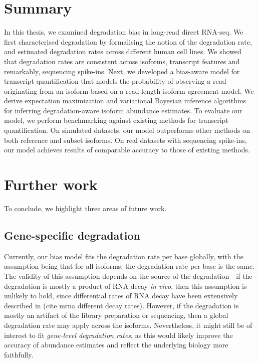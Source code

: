
\section{Summary}

In this thesis, we examined degradation bias in long-read direct RNA-seq. We first characterised degradation by formalising the notion of the degradation rate, and estimated degradation rates across different human cell lines. We showed that degradation rates are consistent across isoforms, transcript features and remarkably, sequencing spike-ins. Next, we developed a bias-aware model for transcript quantification that models the probability of observing a read originating from an isoform based on a read length-isoform agreement model. We derive expectation maximization and variational Bayesian inference algorithms for inferring degradation-aware isoform abundance estimates. To evaluate our model, we perform benchmarking against existing methods for transcript quantification. On simulated datasets, our model outperforms other methods on both reference and subset isoforms. On real datasets with sequencing spike-ins, our model achieves results of comparable accuracy to those of existing methods. 

\section{Further work}

To conclude, we highlight three areas of future work.

\subsection{Gene-specific degradation}

Currently, our bias model fits the degradation rate per base globally, with the assumption being that for all isoforms, the degradation rate per base is the same. The validity of this assumption depends on the source of the degradation - if the degradation is mostly a product of RNA decay \textit{in vivo}, then this assumption is unlikely to hold, since differential rates of RNA decay have been extensively described in (cite mrna different decay rates). However, if the degradation is mostly an artifact of the library preparation or sequencing, then a global degradation rate may apply across the isoforms. Nevertheless, it might still be of interest to fit \textit{gene-level degradation rates}, as this would likely improve the accuracy of abundance estimates and reflect the underlying biology more faithfully. 

